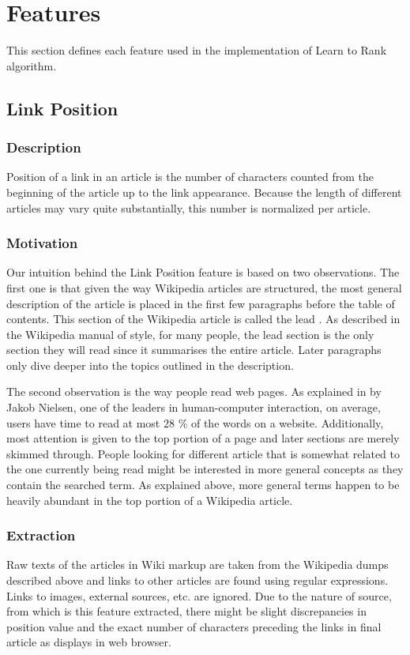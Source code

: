 \section{Features}
This section defines each feature used in the implementation of Learn to Rank algorithm.



\subsection{Link Position}
\subsubsection{Description}
Position of a link in an article is the number of characters counted from the beginning of the article up to the link appearance. Because the length of different articles may vary quite substantially, this number is normalized per article.

\subsubsection{Motivation}
Our intuition behind the Link Position feature is based on two observations. The first one is that given the way Wikipedia articles are structured, the most general description of the article is placed in the first few paragraphs before the table of contents. This section of the Wikipedia article is called the lead \cite{lead}. As described in the Wikipedia manual of style, for many people, the lead section is the only section they will read since it summarises the entire article. Later paragraphs only dive deeper into the topics outlined in the description. 

The second observation is the way people read web pages. As explained in \cite{nielsen} by Jakob Nielsen, one of the leaders in human-computer interaction, on average, users have time to read at most 28 \% of the words on a website. Additionally, most attention is given to the top portion of a page and later sections are merely skimmed through. People looking for different article that is somewhat related to the one currently being read might be interested in more general concepts as they contain the searched term. As explained above, more general terms happen to be heavily abundant in the top portion of a Wikipedia article.

\subsubsection{Extraction}
Raw texts of the articles in Wiki markup are taken from the Wikipedia dumps described above and links to other articles are found using regular expressions. Links to images, external sources, etc. are ignored. Due to the nature of source, from which is this feature extracted, there might be slight discrepancies in position value and the exact number of characters preceding the links in final article as displays in web browser.

